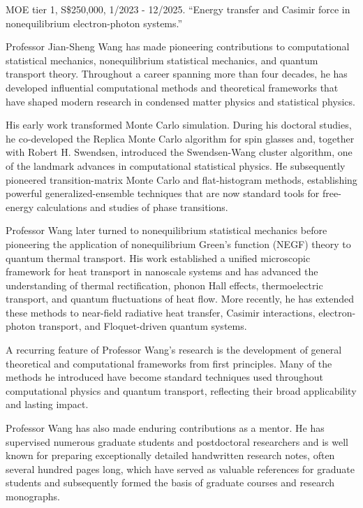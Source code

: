 \bul MOE tier 1, S\$250,000, 1/2023 - 12/2025. 
``Energy transfer and Casimir force in nonequilibrium electron-photon systems.''


Professor Jian-Sheng Wang has made pioneering contributions to computational statistical mechanics, nonequilibrium statistical mechanics, and quantum transport theory. Throughout a career spanning more than four decades, he has developed influential computational methods and theoretical frameworks that have shaped modern research in condensed matter physics and statistical physics.

His early work transformed Monte Carlo simulation. During his doctoral studies, he co-developed the Replica Monte Carlo algorithm for spin glasses and, together with Robert H. Swendsen, introduced the Swendsen-Wang cluster algorithm, one of the landmark advances in computational statistical physics. He subsequently pioneered transition-matrix Monte Carlo and flat-histogram methods, establishing powerful generalized-ensemble techniques that are now standard tools for free-energy calculations and studies of phase transitions.

Professor Wang later turned to nonequilibrium statistical mechanics before pioneering the application of nonequilibrium Green's function (NEGF) theory to quantum thermal transport. His work established a unified microscopic framework for heat transport in nanoscale systems and has advanced the understanding of thermal rectification, phonon Hall effects, thermoelectric transport, and quantum fluctuations of heat flow. More recently, he has extended these methods to near-field radiative heat transfer, Casimir interactions, electron-photon transport, and Floquet-driven quantum systems.

A recurring feature of Professor Wang's research is the development of general theoretical and computational frameworks from first principles. Many of the methods he introduced have become standard techniques used throughout computational physics and quantum transport, reflecting their broad applicability and lasting impact.

Professor Wang has also made enduring contributions as a mentor. He has supervised numerous graduate students and postdoctoral researchers and is well known for preparing exceptionally detailed handwritten research notes, often several hundred pages long, which have served as valuable references for graduate students and subsequently formed the basis of graduate courses and research monographs.

